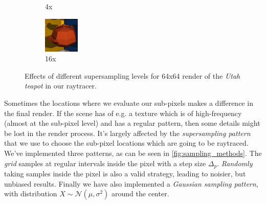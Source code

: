 \documentclass[a4paper, twocolumn]{article}
\begin{document}
\begin{figure}[ht]
\begin{subfigure}{0.32\linewidth}
                    \caption{4x}
                \end{subfigure} \hfill
                \begin{subfigure}{0.32\linewidth}
                    \centering
                    \label{fig:aliasing16x}
                    \includegraphics[width=\linewidth]{share/aliasing_16x.png}
                    \caption{16x}
                \end{subfigure}
                \caption{Effects of different supersampling levels for 64x64 render of the \emph{Utah teapot} in our raytracer.}
                \label{fig:aliasing}
            \end{figure}

            Sometimes the locations where we evaluate our sub-pixels makes a difference in the final render. If the scene has of e.g. a texture which is of high-frequency (almost at the sub-pixel level) and has a regular pattern, then some details might be lost in the render process. It's largely affected by the \emph{supersampling pattern} that we use to choose the sub-pixel locations which are going to be raytraced. We've implemented three patterns, as can be seen in \cref{fig:sampling_methods}. The \emph{grid} samples at regular intervals inside the pixel with a step size \(\Delta_p\). \emph{Randomly} taking samples inside the pixel is also a valid strategy, leading to noisier, but unbiased results. Finally we have also implemented a \emph{Gaussian sampling pattern}, with distribution \(X \sim \mathcal{N}(\mu, \sigma^2)\) around the center.
\end{document}
